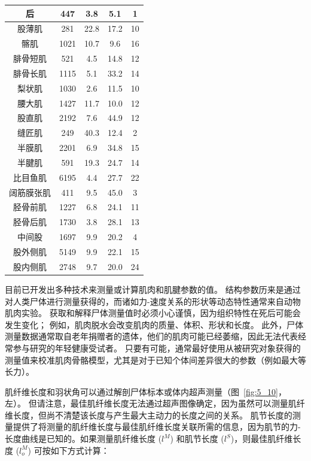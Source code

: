 \begin{table}[htbp]
\begin{tabular}{ccccc}
		后 & 447 &  3.8 & 5.1 & 1 \\
		\midrule
		股薄肌 & 281 &  22.8 & 17.2 & 10 \\
		\midrule
		髂肌 & 1021 &  10.7 & 9.6 & 16 \\
		\midrule
		腓骨短肌 & 521 &  4.5 & 14.8 & 12 \\
		\midrule
		腓骨长肌 & 1115 &  5.1 & 33.2 & 14 \\
		\midrule
		梨状肌 & 1030 &  2.6 & 11.5 & 10 \\
		\midrule
		腰大肌 & 1427 &  11.7 & 10.0 & 12 \\
		\midrule
		股直肌 & 2192 &  7.6 & 44.9 & 12 \\
		\midrule
		缝匠肌 & 249 &  40.3 & 12.4 & 2 \\
		\midrule
		半膜肌 & 2201 &  6.9 & 34.8 & 15 \\
		\midrule
		半腱肌 & 591 &  19.3 & 24.7 & 14 \\
		\midrule
		比目鱼肌 & 6195 &  4.4 & 27.7 & 22 \\
		\midrule
		阔筋膜张肌 & 411 &  9.5 & 45.0 & 3 \\
		\midrule
		胫骨前肌 & 1227 &  6.8 & 24.1 & 11 \\
		\midrule
		胫骨后肌 & 1730 &  3.8 & 28.1 & 13 \\
		\midrule
		中间股 & 1697 &  9.9 & 20.2 & 4 \\
		\midrule
		股外侧肌 & 5149 &  9.9 & 22.1 & 15 \\
		\midrule
		股内侧肌 & 2748 &  9.7 & 20.0 & 24 \\
		\bottomrule
	\end{tabular}
\end{table}


目前已开发出多种技术来测量或计算肌肉和肌腱参数的值。
结构参数历来是通过对人类尸体进行测量获得的，而诸如力-速度关系的形状等动态特性通常来自动物肌肉实验。
获取和解释尸体测量值时必须小心谨慎，因为组织特性在死后可能会发生变化；
例如，肌肉脱水会改变肌肉的质量、体积、形状和长度。
此外，尸体测量数据通常取自老年捐赠者的遗体，他们的肌肉可能已经萎缩，因此无法代表经常参与研究的年轻健康受试者。
只要有可能，通常最好使用从被研究对象获得的测量值来校准肌肉骨骼模型，尤其是对于已知个体间差异很大的参数（例如最大等长力）。


肌纤维长度和羽状角可以通过解剖尸体标本或体内超声测量（图~\ref{fig:5_10}，左）。
但请注意，最佳肌纤维长度无法通过超声图像确定，因为虽然可以测量肌纤维长度，但尚不清楚该长度与产生最大主动力的长度之间的关系。
肌节长度的测量提供了将测量的肌纤维长度与最佳肌纤维长度关联所需的信息，因为肌节的力-长度曲线是已知的。如果测量肌纤维长度 ($l^M$) 和肌节长度 ($l^S$)，则最佳肌纤维长度 ($l_o^M$) 可按如下方式计算：



